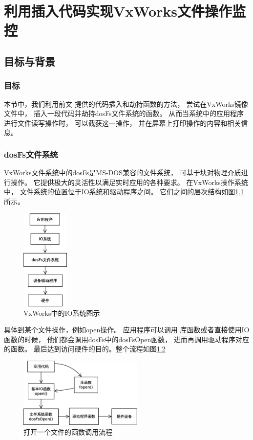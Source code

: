 \chapter{利用插入代码实现VxWorks文件操作监控}

\section{目标与背景}

\subsection{目标}

本节中，我们利用前文
提供的代码插入和劫持函数的方法，
尝试在VxWorks镜像文件中，
插入一段代码并劫持dosFs文件系统的函数。
从而当系统中的应用程序进行文件读写操作时，
可以截获这一操作，
并在屏幕上打印操作的内容和相关信息。

\subsection{dosFs文件系统}

VxWorks文件系统中的dosFs是MS-DOS兼容的文件系统，
可基于块对物理介质进行操作。
它提供极大的灵活性以满足实时应用的各种要求。
在VxWorks操作系统中，
文件系统的位置位于IO系统和驱动程序之间。
它们之间的层次结构如图\ref{iosys}所示。

\begin{figure}[h!]
    \centering
    \includegraphics[width=0.21\textwidth]{figure/IOsys.eps}
    \caption{VxWorks中的IO系统图示}
    \label{iosys}
\end{figure}

具体到某个文件操作，例如open操作。
应用程序可以调用
库函数或者直接使用IO函数的时候，
他们都会调用dosFs中的dosFsOpen函数，
进而再调用驱动程序对应的函数。
最后达到访问硬件的目的。整个流程如图\ref{open}

\begin{figure}[h!]
    \centering
\includegraphics[width=0.55\textwidth]{figure/open.eps}
    \caption{打开一个文件的函数调用流程}
    \label{open}
\end{figure}

